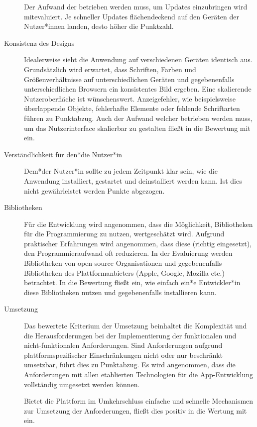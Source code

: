 \begin{description}
	      Der Aufwand der betrieben werden muss, um Updates einzubringen wird mitevaluiert. Je schneller Updates flächendeckend auf den Geräten der Nutzer*innen landen, desto höher die Punktzahl.

	\item [Konsistenz des Designs]
	      Idealerweise sieht die Anwendung auf verschiedenen Geräten identisch aus. Grundsätzlich wird erwartet, dass Schriften, Farben und Größenverhältnisse auf unterschiedlichen Geräten und gegebenenfalls unterschiedlichen Browsern ein konsistentes Bild ergeben.
	      Eine skalierende Nutzeroberfläche ist wünschenswert. Anzeigefehler, wie beispielsweise überlappende Objekte, fehlerhafte Elemente oder fehlende Schriftarten führen zu Punktabzug. Auch der Aufwand welcher betrieben werden muss, um das Nutzerinterface skalierbar zu gestalten fließt in die Bewertung mit ein.

	\item[Verständlichkeit für den*die Nutzer*in]
	      Dem*der Nutzer*in sollte zu jedem Zeitpunkt klar sein, wie die Anwendung installiert, gestartet und deinstalliert werden kann. Ist dies nicht gewährleistet werden Punkte abgezogen.

	\item[Bibliotheken]
		Für die Entwicklung wird angenommen, dass die Möglichkeit, Bibliotheken für die Programmierung zu nutzen, wertgeschätzt wird. Aufgrund praktischer Erfahrungen wird angenommen, dass diese (richtig eingesetzt), den Programmieraufwand oft reduzieren. In der Evaluierung werden Bibliotheken von open-source Organisationen und gegebenenfalls Bibliotheken des Plattformanbieters (Apple, Google, Mozilla etc.) betrachtet. In die Bewertung fließt ein, wie einfach ein*e Entwickler*in diese Bibliotheken nutzen und gegebenenfalls installieren kann. 

	\item[Umsetzung]
		Das bewertete Kriterium der Umsetzung beinhaltet die Komplexität und die Herausforderungen bei der Implementierung der funktionalen und nicht-funktionalen Anforderungen. Sind Anforderungen aufgrund plattformspezifischer Einschränkungen nicht oder nur beschränkt umsetzbar, führt dies zu Punktabzug. Es wird angenommen, dass die Anforderungen mit allen etablierten Technologien für die App-Entwicklung vollständig umgesetzt werden können.
		
		Bietet die Plattform im Umkehrschluss einfache und schnelle Mechanismen zur Umsetzung der Anforderungen, fließt dies positiv in die Wertung mit ein.
		

\end{description}
